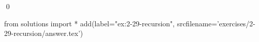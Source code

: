
\begin{ex}
  \label{ex:2-29-recursion}
  
  \qed
\end{ex}
\begin{python0}
from solutions import *
add(label="ex:2-29-recursion",
    srcfilename='exercises/2-29-recursion/answer.tex')
\end{python0}

